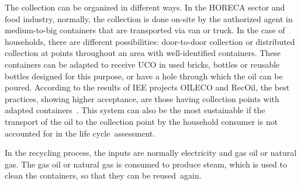 \documentclass[sustainability,article,accept,moreauthors,pdftex,12pt,a4paper]{mdpi}
\begin{document}
The collection can be organized in different ways. In the HORECA sector and food industry, normally, the collection is done on-site by the authorized agent in medium-to-big containers that are transported via van or truck. In the case of households, there are different possibilities: door-to-door collection or distributed collection at points throughout an area with well-identified containers. These containers can be adapted to receive UCO in used bricks, bottles or reusable bottles designed for this purpose, or have a hole through which the oil can be poured. According to the results of IEE projects OILECO and RecOil, the best practices, showing higher acceptance, are those having collection points with adapted containers~\cite{OILECO2013,RecOil2013}. This system can also be the most sustainable if the transport of the oil to the collection point by the household consumer is not accounted for in the life \mbox{cycle assessment.}

In the recycling process, the inputs are normally electricity and gas oil or natural gas. The gas oil or natural gas is consumed to produce steam, which is used to clean the containers, so that they can be \mbox{reused again.}
\end{document}
